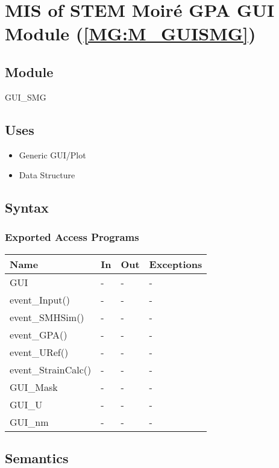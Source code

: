 \documentclass[12pt, titlepage]{article}
\begin{document}
\section{MIS of STEM Moir{\'e} GPA GUI Module (\texorpdfstring{\cref{MG:M_GUISMG}}))} \label{MIS_GUISMG}

\subsection{Module}
GUI{\_}SMG
\subsection{Uses}
\begin{itemize}
\item Generic GUI/Plot
\item Data Structure
\end{itemize}

\subsection{Syntax}

\subsubsection{Exported Access Programs}

\begin{center}
\begin{tabular}{p{4cm} p{2cm} p{2cm} p{2cm}}
\hline
\textbf{Name} & \textbf{In} & \textbf{Out} & \textbf{Exceptions} \\
\hline
GUI & - & - & - \\
event{\_}Input() & - & - & - \\
event{\_}SMHSim() & - & - & - \\
event{\_}GPA() & - & - & - \\
event{\_}URef() & - & - & - \\
event{\_}StrainCalc() & - & - & - \\
GUI{\_}Mask & - & - & - \\
GUI{\_}U & - & - & - \\
GUI{\_}nm & - & - & - \\
\hline
\end{tabular}
\end{center}

\subsection{Semantics}
\end{document}
